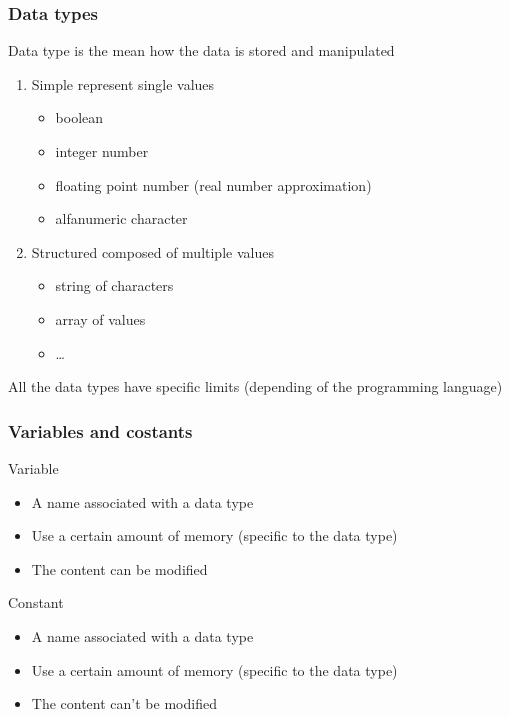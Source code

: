\begin{frame}
  \frametitle{Data types}
  \begin{block}{Data type}
    is the mean how the data is stored and manipulated
  \end{block}
  \begin{enumerate}
  \item \alert{Simple} represent single values
    \begin{itemize}
    \item boolean
    \item integer number
    \item floating point number (real number approximation)
    \item alfanumeric character
    \end{itemize}
  \item \alert{Structured} composed of multiple values
    \begin{itemize}
    \item string of characters
    \item array of values
    \item \dots
    \end{itemize}
  \end{enumerate}
  \pause
  All the data types have specific \alert{limits} (depending of the
  programming language)
\end{frame}

\begin{frame}
  \frametitle{Variables and costants}
  \begin{center}
  \end{center}
  \begin{block}{Variable}
    \begin{itemize}
    \item A name associated with a data type
    \item Use a certain amount of memory (specific to the data type)
    \item The content \alert{can} be modified
    \end{itemize}
  \end{block}
  \pause
  \begin{block}{Constant}
    \begin{itemize}
    \item A name associated with a data type
    \item Use a certain amount of memory (specific to the data type)
    \item The content \alert{can't} be modified
    \end{itemize}
  \end{block}
\end{frame}

